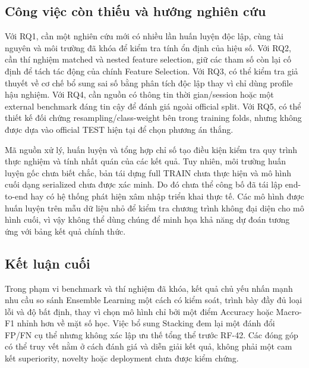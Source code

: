 \subsection{Công việc còn thiếu và hướng nghiên cứu}
Với RQ1, cần một nghiên cứu mới có nhiều lần huấn luyện độc lập, cùng tài nguyên và môi trường đã khóa để kiểm tra tính ổn định của hiệu số. Với RQ2, cần thí nghiệm matched và nested feature selection, giữ các tham số còn lại cố định để tách tác động của chính Feature Selection. Với RQ3, có thể kiểm tra giả thuyết về cơ chế bổ sung sai số bằng phân tích độc lập thay vì chỉ dùng profile hậu nghiệm. Với RQ4, cần nguồn có thông tin thời gian/session hoặc một external benchmark đáng tin cậy để đánh giá ngoài official split. Với RQ5, có thể thiết kế đối chứng resampling/class-weight bên trong training folds, nhưng không được dựa vào official TEST hiện tại để chọn phương án thắng.

Mã nguồn xử lý, huấn luyện và tổng hợp chỉ số tạo điều kiện kiểm tra quy trình thực nghiệm và tính nhất quán của các kết quả. Tuy nhiên, môi trường huấn luyện gốc chưa biết chắc, bản tái dựng full TRAIN chưa thực hiện và mô hình cuối dạng serialized chưa được xác minh. Do đó chưa thể công bố đã tái lập end-to-end hay có hệ thống phát hiện xâm nhập triển khai thực tế. Các mô hình được huấn luyện trên mẫu dữ liệu nhỏ để kiểm tra chương trình không đại diện cho mô hình cuối, vì vậy không thể dùng chúng để minh họa khả năng dự đoán tương ứng với bảng kết quả chính thức.

\subsection{Kết luận cuối}
Trong phạm vi benchmark và thí nghiệm đã khóa, kết quả chủ yếu nhấn mạnh nhu cầu so sánh Ensemble Learning một cách có kiểm soát, trình bày đầy đủ loại lỗi và độ bất định, thay vì chọn mô hình chỉ bởi một điểm Accuracy hoặc Macro-F1 nhỉnh hơn về mặt số học. Việc bổ sung Stacking đem lại một đánh đổi FP/FN cụ thể nhưng không xác lập ưu thế tổng thể trước RF-42. Các đóng góp có thể truy vết nằm ở cách đánh giá và diễn giải kết quả, không phải một cam kết superiority, novelty hoặc deployment chưa được kiểm chứng.
